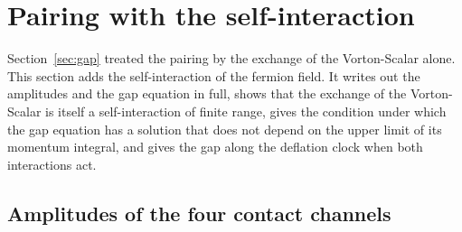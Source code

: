 \section{Pairing with the self-interaction}
\label{sec:gapcontact}

Section~\ref{sec:gap} treated the pairing by the exchange of the Vorton-Scalar alone. This section
adds the self-interaction of the fermion field. It writes out the amplitudes and the gap equation in
full, shows that the exchange of the Vorton-Scalar is itself a self-interaction of finite range,
gives the condition under which the gap equation has a solution that does not depend on the upper
limit of its momentum integral, and gives the gap along the deflation clock when both interactions
act.

\subsection{Amplitudes of the four contact channels}

